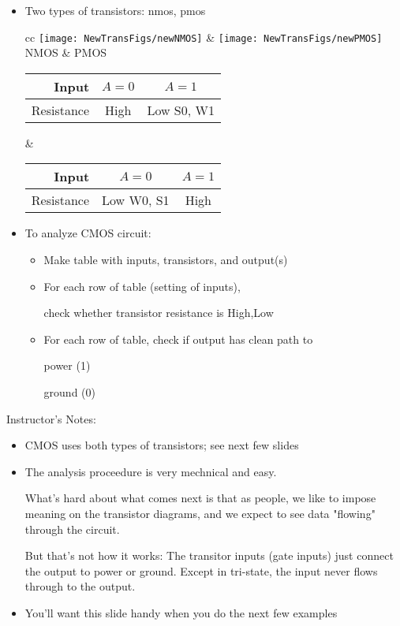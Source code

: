 \begin{frame}[fragile]
\begin{itemize}
	\item Two types of transistors: nmos, pmos

	\begin{center}
        \footnotesize
	\begin{tabular}{cc}
		\texttt{[image: NewTransFigs/newNMOS]} &
		\texttt{[image: NewTransFigs/newPMOS]} \\
	NMOS & PMOS\\
	\begin{tabular}{|r|cc|}
	\hline
	Input& $A=0$ & $A=1$\\
	\hline
		Resistance& High & Low \normalsize S0, W1\\
	\hline
	\end{tabular} &

	\begin{tabular}{|r|cc|}
	\hline
	Input& $A=0$ & $A=1$\\
	\hline
		Resistance& Low  \normalsize W0, S1& High\\
	\hline
	\end{tabular}
	\end{tabular}
	\end{center}
	\item To analyze CMOS circuit:
	\begin{itemize}
		\item Make table with inputs, transistors, and output(s)
		\item For each row of table (setting of inputs),

			check whether transistor resistance is High,Low
		\item For each row of table, check if output has clean path to

			power (1)

			ground (0)
	\end{itemize}
\end{itemize}
\end{frame}
\BNotes\ifnum{}
\begin{frame}[fragile]
Instructor's Notes:
\begin{itemize}
	\item CMOS uses both types of transistors; see next few slides
	\item The analysis proceedure is very mechnical and easy.

		What's hard about what comes next is that as people, we
		like to impose meaning on the transistor diagrams, and
		we expect to see data "flowing" through the circuit.

		But that's not how it works: The transitor inputs (gate
		inputs) just connect the output to power or ground.
		Except in tri-state, the input never flows through to the
		output.
	\item You'll want this slide handy when you do the next few examples
\end{itemize}
\end{frame}
\fi\ENotes

